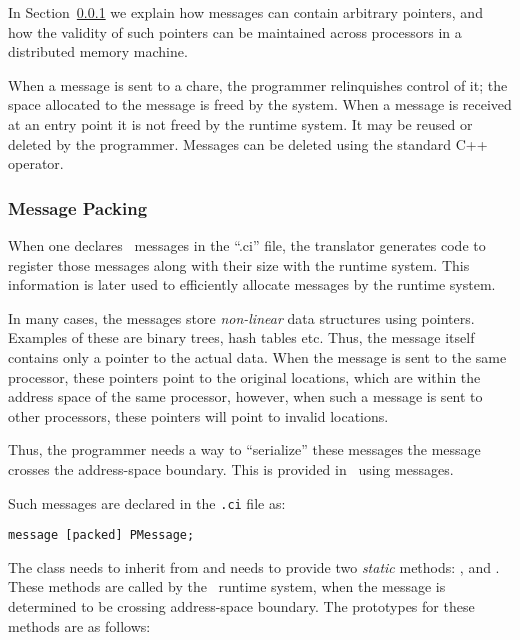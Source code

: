 In Section~\ref{message packing} we explain how messages can
contain arbitrary pointers, and how the validity of such pointers can be
maintained across processors in a distributed memory machine.

When a message  is sent to a chare, the programmer
relinquishes control of it; the space allocated to the message is
freed by the system.  When a message is received at an entry point it
is not freed by the runtime system.  It may be reused or deleted by
the programmer.  Messages can be deleted using the standard C++
 operator.  


\subsubsection{Message Packing}
\label{message packing}

When one declares \charmpp\ messages in the ``.ci'' file, the
translator generates code to register those messages along with their
size with the runtime system. This information is later used to
efficiently allocate messages by the runtime system.

In many cases, the messages store {\em non-linear} data structures
using pointers.  Examples of these are binary trees, hash tables
etc. Thus, the message itself contains only a pointer to the actual
data. When the message is sent to the same processor, these pointers
point to the original locations, which are within the address space of
the same processor, however, when such a message is sent to other
processors, these pointers will point to invalid locations.

Thus, the programmer needs a way to ``serialize'' these messages
 the message crosses the address-space boundary. This is
provided in \charmpp\ using
 messages.

Such messages are declared in the {\tt .ci} file as:

\verb+message [packed] PMessage;+

The class  needs to inherit from 
and needs to provide two {\em static} methods: , 
and  . These methods are called by the
\charmpp\ runtime system, when the message is determined to be
crossing address-space boundary. The prototypes for these methods are
as follows:

